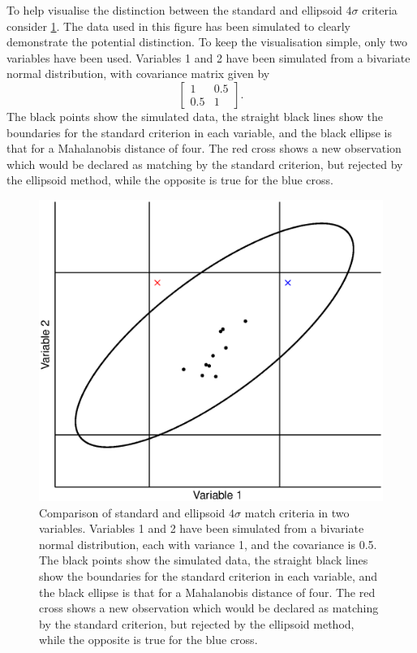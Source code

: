 \documentclass[a4paper]{article}
\begin{document}
To help visualise the distinction between the standard and ellipsoid $4\sigma$ criteria consider \cref{fig:ellipse}. The data used in this figure has been simulated to clearly demonstrate the potential distinction. To keep the visualisation simple, only two variables have been used. Variables 1 and 2 have been simulated from a bivariate normal distribution, with covariance matrix given by
\begin{equation*}
    \begin{bmatrix}
        1 & 0.5 \\ 0.5 & 1
    \end{bmatrix}.
\end{equation*}
The black points show the simulated data, the straight black lines show the boundaries for the standard criterion in each variable, and the black ellipse is that for a Mahalanobis distance of four. The red cross shows a new observation which would be declared as matching by the standard criterion, but rejected by the ellipsoid method, while the opposite is true for the blue cross.



\begin{figure}[h]
	\centering
	\includegraphics[width=0.8\linewidth]{figures/ellipse.eps}
	\caption{Comparison of standard and ellipsoid $4\sigma$ match criteria in two variables. Variables 1 and 2 have been simulated from a bivariate normal distribution, each with variance 1, and the covariance is 0.5. The black points show the simulated data, the straight black lines show the boundaries for the standard criterion in each variable, and the black ellipse is that for a Mahalanobis distance of four. The red cross shows a new observation which would be declared as matching by the standard criterion, but rejected by the ellipsoid method, while the opposite is true for the blue cross.}
	\label{fig:ellipse}
\end{figure}
\end{document}
